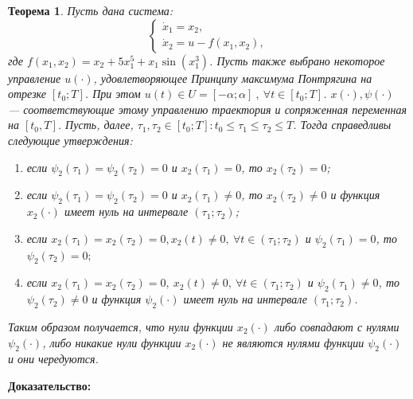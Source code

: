 \documentclass[11pt]{article}
\newtheorem{theorem}{Теорема}
\begin{document}
\begin{theorem}
	Пусть дана система:
	\[ \begin{cases}
		\dot{x}_1 = x_2,
		\\
		\dot{x}_2 = u - f(x_1, x_2),
	\end{cases} \]
	где \( f(x_1, x_2) = x_2 + 5x_1^5 + x_1 \sin(x_1^3) \). Пусть также выбрано некоторое управление \( u(\cdot) \), удовлетворяющее Принципу максимума Понтрягина на отрезке \( [t_0; T] \). При этом \(u(t) \in U = [-\alpha; \alpha] \ , \ \forall t \in [t_0; T] \). \( x(\cdot) , \psi(\cdot) \) --- соответствующие этому управлению траектория и сопряженная переменная на \( [t_0, T] \). Пусть, далее, \( \tau_1, \tau_2 \in [t_0; T] : t_0 \le \tau_1 \le \tau_2 \le T\). Тогда справедливы следующие утверждения:
	\begin{enumerate}
		\item если \( \psi_2(\tau_1) = \psi_2(\tau_2) = 0 \) и \( x_2(\tau_1) = 0 \), то \( x_2(\tau_2) = 0 \);
		\item если \( \psi_2(\tau_1) = \psi_2(\tau_2) = 0 \) и \(x_2(\tau_1) \ne 0 \), то \( x_2(\tau_2) \ne 0\) и функция \( x_2(\cdot) \) имеет нуль на интервале \( (\tau_1; \tau_2) \);
		\item если \( x_2(\tau_1) = x_2(\tau_2) = 0, x_2(t) \ne 0, \ \forall t \in (\tau_1; \tau_2) \) и \( \psi_2(\tau_1) = 0\), то \( \psi_2(\tau_2) = 0; \)
		\item если \( x_2(\tau_1) = x_2(\tau_2) = 0, \ x_2(t) \ne 0, \ \forall t \in (\tau_1; \tau_2) \) и \( \psi_2(\tau_1) \ne 0 \), то \( \psi_2(\tau_2) \ne 0 \) и функция \( \psi_2(\cdot) \) имеет нуль на интервале \( (\tau_1; \tau_2) \).
	\end{enumerate}
	Таким образом получается, что нули функции \( x_2(\cdot) \) либо совпадают с нулями \( \psi_2(\cdot) \), либо никакие нули функции \( x_2(\cdot) \) не являются нулями функции \( \psi_2(\cdot) \) и они чередуются.
\end{theorem}
\textbf{Доказательство:}
\end{document}
